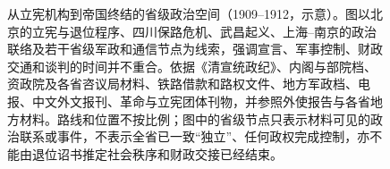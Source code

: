 \begin{figure}[htbp]
  \caption{从立宪机构到帝国终结的省级政治空间（1909--1912，示意）。图以北京的立宪与退位程序、四川保路危机、武昌起义、上海--南京的政治联络及若干省级军政和通信节点为线索，强调宣言、军事控制、财政交通和谈判的时间并不重合。依据《清宣统政纪》、内阁与部院档、资政院及各省咨议局材料、铁路借款和路权文件、地方军政档、电报、中文外文报刊、革命与立宪团体刊物，并参照外使报告与各省地方材料。路线和位置不按比例；图中的省级节点只表示材料可见的政治联系或事件，不表示全省已一致“独立”、任何政权完成控制，亦不能由退位诏书推定社会秩序和财政交接已经结束。}
  \label{fig:revolution-provincial-order}
\end{figure}
